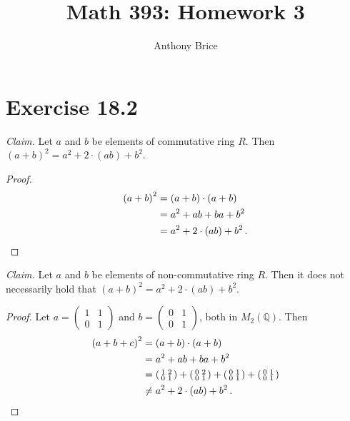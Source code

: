 \documentclass{abrice}
\title{Math 393: Homework 3}
\author{Anthony Brice}
\newcommand{\Q}{\mathbb{Q}}
\begin{document}
\maketitle

\section{Exercise 18.2}

\emph{Claim.} Let $a$ and $b$ be elements of commutative ring $R$. Then ${(a + b)}^2 = a^2
+ 2 \cdot (ab) + b^2$.

\begin{proof}
  \begin{align*}
    {(a + b)}^2
    &= (a + b) \cdot (a + b) \\
    &= a^2 + ab + ba + b^2 \\
    &= a^2 + 2 \cdot (ab) + b^2\, . \qedhere
  \end{align*}
\end{proof}

\noindent
\emph{Claim.} Let $a$ and $b$ be elements of non-commutative ring $R$. Then it
does not necessarily hold that ${(a + b)}^2 = a^2 + 2 \cdot (ab) + b^2$.

\begin{proof}
  Let $a = \left(\begin{smallmatrix} 1&1 \\ 0&1 \end{smallmatrix} \right)$ and
  $b = \left( \begin{smallmatrix} 0&1 \\ 0&1 \end{smallmatrix} \right)$, both in
  $M_2(\Q)$. Then
  \begin{align*}
    {(a + b + c)}^2
    &= (a + b) \cdot (a + b) \\
    &= a^2 + ab + ba + b^2 \\
    &= \left(  \begin{smallmatrix} 1&2 \\ 0&1 \end{smallmatrix} \right)
      + \left( \begin{smallmatrix} 0&2 \\ 0&1 \end{smallmatrix} \right)
      + \left( \begin{smallmatrix} 0&1 \\ 0&1 \end{smallmatrix} \right)                                       + \left( \begin{smallmatrix} 0&1 \\ 0&1 \end{smallmatrix} \right) \\
    &\neq a^2 + 2 \cdot (ab) + b^2\, . \qedhere
  \end{align*}
\end{proof}
\end{document}
